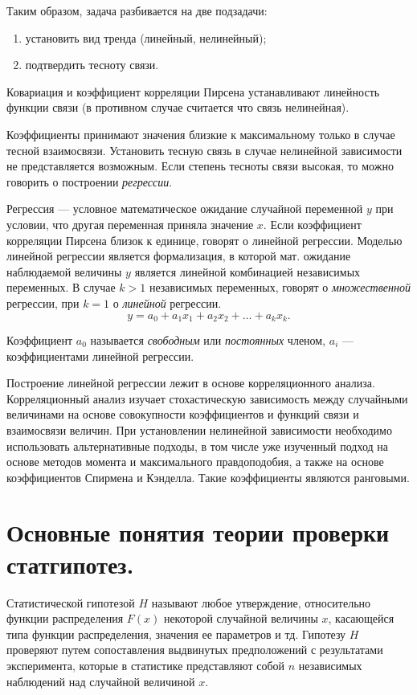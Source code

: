 \documentclass[12pt]{article}
\begin{document}
Таким образом, задача разбивается на две подзадачи:
\begin{enumerate}
    \item установить вид тренда (линейный, нелинейный);
    \item подтвердить тесноту связи.
\end{enumerate}

Ковариация и коэффициент корреляции Пирсена устанавливают линейность функции связи (в противном случае считается что связь нелинейная).

Коэффициенты принимают значения близкие к максимальному только в случае тесной взаимосвязи. Установить тесную связь в случае нелинейной зависимости не представляется возможным. Если степень тесноты связи высокая, то можно говорить о построении \emph{регрессии}. 

Регрессия --- условное математическое ожидание случайной переменной $y$ при условии, что другая переменная приняла значение $x$. Если коэффициент корреляции Пирсена близок к единице, говорят о линейной регрессии. Моделью линейной регрессии является формализация, в которой мат. ожидание наблюдаемой величины $y$ является линейной комбинацией независимых переменных. В случае $k > 1$ независимых переменных, говорят о \emph{множественной} регрессии, при $k = 1$ о \emph{линейной} регрессии.
\[ y = a_0 + a_1 x_1 + a_2 x_2 + \ldots + a_k x_k. \]

Коэффициент $a_0$ называется \emph{свободным} или \emph{постоянных} членом, $a_i$ --- коэффициентами линейной регрессии.

Построение линейной регрессии лежит в основе корреляционного анализа. Корреляционный анализ изучает стохастическую зависимость между случайными величинами на основе совокупности коэффициентов и функций связи и взаимосвязи величин. При установлении нелинейной зависимости необходимо использовать альтернативные подходы, в том числе уже изученный подход на основе методов момента и максимального правдоподобия, а также на основе коэффициентов Спирмена и Кэнделла. Такие коэффициенты являются ранговыми.


\newpage
\section{Основные понятия теории проверки статгипотез.}
Статистической гипотезой $H$ называют любое утверждение, относительно функции распределения $F(x)$ некоторой случайной величины $x$, касающейся типа функции распределения, значения ее параметров и тд. Гипотезу $H$ проверяют путем сопоставления выдвинутых предположений с результатами эксперимента, которые в статистике представляют собой $n$ независимых наблюдений над случайной величиной $x$.
\end{document}
